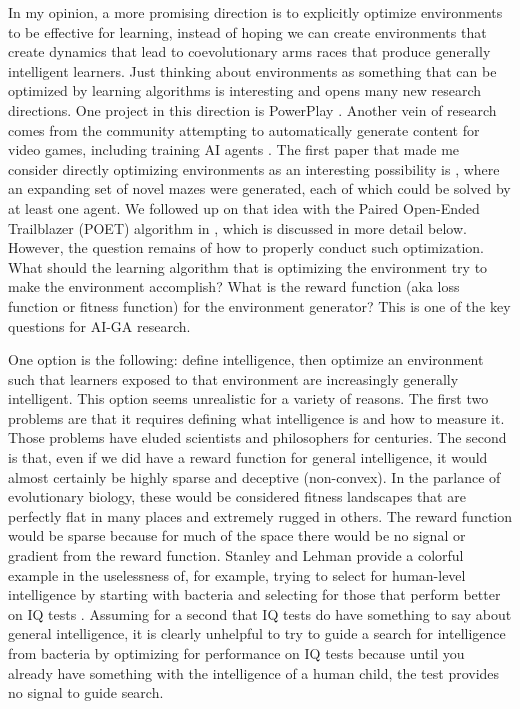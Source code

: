 \documentclass{article}
\begin{document}
In my opinion, a more promising direction is to explicitly optimize environments to be effective for learning, instead of hoping we can create environments that create dynamics that lead to coevolutionary arms races that produce generally intelligent learners. Just thinking about environments as something that can be optimized by learning algorithms is interesting and opens many new research directions. One project in this direction is PowerPlay \cite{schmidhuber2013powerplay,srivastava2013first}. Another vein of research comes from the community attempting to automatically generate content for video games, including training AI agents \cite{justesen2018illuminating,shaker2016procedural,khalifa2016general}. The first paper that made me consider directly optimizing environments as an interesting possibility is \citet{brant2017minimal}, where an expanding set of novel mazes were generated, each of which could be solved by at least one agent. We followed up on that idea with the Paired Open-Ended Trailblazer (POET) algorithm in \citet{wang2019paired}, which is discussed in more detail below. However, the question remains of how to properly conduct such optimization. What should the learning algorithm that is optimizing the environment try to make the environment accomplish? What is the reward function (aka loss function or fitness function) for the environment generator? This is one of the key questions for AI-GA research. 

One option is the following: define intelligence, then optimize an environment such that learners exposed to that environment are increasingly generally intelligent. This option seems unrealistic for a variety of reasons. The first two problems are that it requires defining what intelligence is and how to measure it. Those problems have eluded scientists and philosophers for centuries. The second is that, even if we did have a reward function for general intelligence, it would almost certainly be highly sparse and deceptive (non-convex). In the parlance of evolutionary biology, these would be considered fitness landscapes that are perfectly flat in many places and extremely rugged in others. The reward function would be sparse because for much of the space there would be no signal or gradient from the reward function. Stanley and Lehman provide a colorful example in the uselessness of, for example, trying to select for human-level intelligence by starting with bacteria and selecting for those that perform better on IQ tests \cite{stanley2015greatness}. Assuming for a second that IQ tests do have something to say about general intelligence, it is clearly unhelpful to try to guide a search for intelligence from bacteria by optimizing for performance on IQ tests because until you already have something with the intelligence of a human child, the test provides no signal to guide search. 
\end{document}
